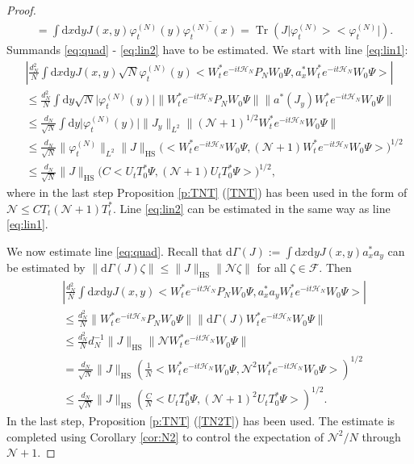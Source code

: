 \documentclass[11pt,a4paper,draft,DIV11]{scrartcl}	%
\newcommand{\fock}{\mathcal{F}}		%
\newcommand{\di}{\textrm{d}}		%
\newcommand{\Ncal}{\mathcal{N}}		%
\newcommand{\Hcal}{\mathcal{H}}		%
\newcommand{\scal}[2]{\big<#1,#2\big>} %
\newcommand{\cc}[1]{\overline{#1}}	%
\newcommand{\norm}[1]{\lVert#1\rVert}	%
\newcommand{\ph}{\varphi_t^{(N)}}	%
\newcommand{\project}[1]{\lvert #1 \big>\big< #1\rvert}	%
\newcommand{\Tr}{\operatorname{Tr}}	%
\begin{document}
\begin{proof}
\begin{align*}
& = \int \di x\di y J(x,y) \ph(y) \cc{\ph(x)} = \Tr\left( J\project{\ph} \right).
\end{align*}
Summands \eqref{eq:quad} - \eqref{eq:lin2} have to be estimated. We start with line \eqref{eq:lin1}:
\begin{align*}
& \left\lvert \frac{d_N^2}{N} \int \di x\di y J(x,y) \sqrt{N} \ph(y) \scal{W^\ast_t e^{-it\Hcal_N} P_N W_0 \Psi}{a^\ast_x W^\ast_t e^{-it \Hcal_N} W_0 \Psi} \right\rvert \\
& \leq \frac{d_N^2}{N} \int \di y \sqrt{N} \lvert \ph(y)\rvert \norm{W^\ast_t e^{-it \Hcal_N} P_N W_0 \Psi} \norm{ a^\ast(J_y)W^\ast_t e^{-it \Hcal_N} W_0 \Psi} \\
& \leq \frac{d_N}{\sqrt{N}} \int \di y \lvert \ph(y)\rvert \norm{J_y}_{L^2} \norm{(\Ncal+1)^{1/2}W^\ast_t e^{-it\Hcal_N}W_0 \Psi} \\
& \leq \frac{d_N}{\sqrt{N}} \norm{\ph}_{L^2} \norm{J}_{\textrm{HS}} \Big( \scal{W^\ast_t e^{-it \Hcal_N}W_0 \Psi}{(\Ncal+1)W^\ast_t e^{-it\Hcal_N} W_0 \Psi} \Big)^{1/2} \\
& \leq \frac{d_N}{\sqrt{N}} \norm{J}_{\textrm{HS}} \Big(C \scal{U_t T^\ast_0 \Psi}{(\Ncal+1)U_t T^\ast_0 \Psi} \Big)^{1/2},
\end{align*}
where in the last step Proposition \ref{p:TNT} (\ref{TNT}) has been used in the form of $\Ncal \leq C T_t (\Ncal+1)T^\ast_t$.
Line \eqref{eq:lin2} can be estimated in the same way as line \eqref{eq:lin1}.

We now estimate line \eqref{eq:quad}. Recall that $\di\Gamma(J) := \int \di x\di y J(x,y) a^\ast_x a_y$ can be estimated by $\norm{\di\Gamma(J)\zeta} \leq \norm{J}_{\textrm{HS}} \norm{\Ncal \zeta}$ for all $\zeta \in \fock$. Then
\begin{align*}
& \left\lvert \frac{d_N^2}{N} \int \di x\di y J(x,y) \scal{W^\ast_t e^{-it\Hcal_N} P_N W_0 \Psi}{a^\ast_x a_y W^\ast_t e^{-it \Hcal_N}W_0 \Psi} \right\rvert \\
& \leq \frac{d_N^2}{N} \norm{W^\ast_t e^{-it\Hcal_N}P_N W_0 \Psi} \norm{\di\Gamma(J)W^\ast_t e^{-it \Hcal_N}W_0 \Psi} \\
& \leq \frac{d_N^2}{N} d_N^{-1} \norm{J}_{\textrm{HS}} \norm{\Ncal W^\ast_t e^{-it\Hcal_N}W_0 \Psi} \\
& = \frac{d_N}{\sqrt{N}} \norm{J}_{\textrm{HS}} \left( \frac{1}{N} \scal{W^\ast_t e^{-it\Hcal_N}W_0 \Psi}{\Ncal^2 W^\ast_t e^{-it\Hcal_N}W_0 \Psi} \right)^{1/2} \\
& \leq \frac{d_N}{\sqrt{N}} \norm{J}_{\textrm{HS}} \left( \frac{C}{N} \scal{U_t T^\ast_0 \Psi}{(\Ncal+1)^2 U_t T^\ast_0 \Psi} \right)^{1/2}.
\end{align*}
In the last step, Proposition \ref{p:TNT} (\ref{TN2T}) has been used. The estimate is completed using Corollary \ref{cor:N2} to control the expectation of $\Ncal^2/N$ through $\Ncal+1$.
\end{proof}
\end{document}
